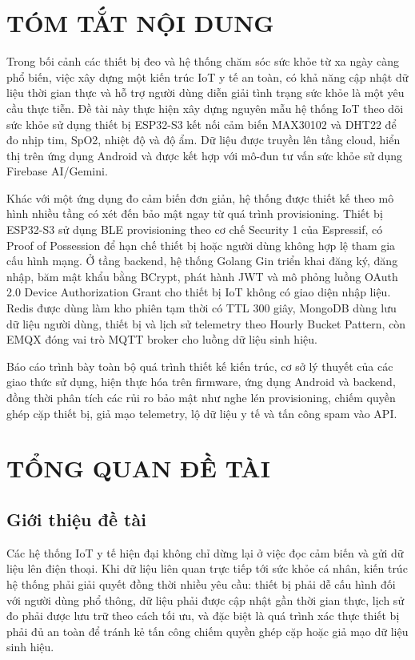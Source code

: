 \documentclass[a4paper,13pt,3p,oneside]{report}
\begin{document}
\newpage
{}
\chapter*{TÓM TẮT NỘI DUNG}
Trong bối cảnh các thiết bị đeo và hệ thống chăm sóc sức khỏe từ xa ngày càng phổ biến, việc xây dựng một kiến trúc IoT y tế an toàn, có khả năng cập nhật dữ liệu thời gian thực và hỗ trợ người dùng diễn giải tình trạng sức khỏe là một yêu cầu thực tiễn. Đề tài này thực hiện xây dựng nguyên mẫu hệ thống IoT theo dõi sức khỏe sử dụng thiết bị ESP32-S3 kết nối cảm biến MAX30102 và DHT22 để đo nhịp tim, SpO2, nhiệt độ và độ ẩm. Dữ liệu được truyền lên tầng cloud, hiển thị trên ứng dụng Android và được kết hợp với mô-đun tư vấn sức khỏe sử dụng Firebase AI/Gemini.

Khác với một ứng dụng đo cảm biến đơn giản, hệ thống được thiết kế theo mô hình nhiều tầng có xét đến bảo mật ngay từ quá trình provisioning. Thiết bị ESP32-S3 sử dụng BLE provisioning theo cơ chế Security 1 của Espressif, có Proof of Possession để hạn chế thiết bị hoặc người dùng không hợp lệ tham gia cấu hình mạng. Ở tầng backend, hệ thống Golang Gin triển khai đăng ký, đăng nhập, băm mật khẩu bằng BCrypt, phát hành JWT và mô phỏng luồng OAuth 2.0 Device Authorization Grant cho thiết bị IoT không có giao diện nhập liệu. Redis được dùng làm kho phiên tạm thời có TTL 300 giây, MongoDB dùng lưu dữ liệu người dùng, thiết bị và lịch sử telemetry theo Hourly Bucket Pattern, còn EMQX đóng vai trò MQTT broker cho luồng dữ liệu sinh hiệu.

Báo cáo trình bày toàn bộ quá trình thiết kế kiến trúc, cơ sở lý thuyết của các giao thức sử dụng, hiện thực hóa trên firmware, ứng dụng Android và backend, đồng thời phân tích các rủi ro bảo mật như nghe lén provisioning, chiếm quyền ghép cặp thiết bị, giả mạo telemetry, lộ dữ liệu y tế và tấn công spam vào API.

\tableofcontents
\listoffigures
\listoftables
\newpage
{}
\pagestyle{fancy}
\fancyhf{}
\fancyhead[R]{\leftmark}
\fancyfoot[R]{\thepage}

\chapter{TỔNG QUAN ĐỀ TÀI}
\section{Giới thiệu đề tài}
Các hệ thống IoT y tế hiện đại không chỉ dừng lại ở việc đọc cảm biến và gửi dữ liệu lên điện thoại. Khi dữ liệu liên quan trực tiếp tới sức khỏe cá nhân, kiến trúc hệ thống phải giải quyết đồng thời nhiều yêu cầu: thiết bị phải dễ cấu hình đối với người dùng phổ thông, dữ liệu phải được cập nhật gần thời gian thực, lịch sử đo phải được lưu trữ theo cách tối ưu, và đặc biệt là quá trình xác thực thiết bị phải đủ an toàn để tránh kẻ tấn công chiếm quyền ghép cặp hoặc giả mạo dữ liệu sinh hiệu.
\end{document}
